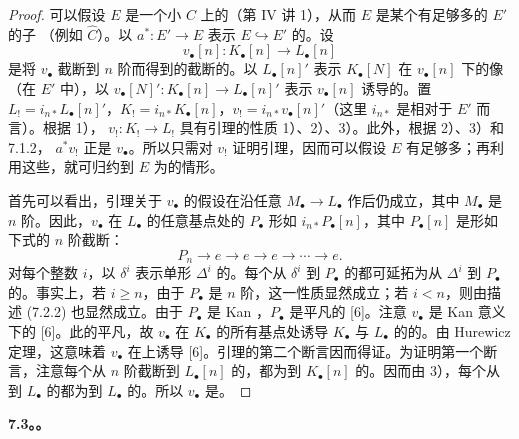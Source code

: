 \begin{proof}
可以假设 $E$ 是一个小 $C$ 上的（第 IV 讲 1），从而 $E$ 是某个有足够多的 $E'$ 的子
（例如 $\widehat C$）。以 $a^*:E'\to E$ 表示 $E\hookrightarrow E'$ 的。设
\[v_\bullet[n]:K_\bullet[n]\longrightarrow L_\bullet[n]\]
是将 $v_\bullet$ 截断到 $n$ 阶而得到的截断的。以 $L_\bullet[n]'$ 表示 $K_\bullet[N]$ 在 $v_\bullet[n]$ 下的像（在 $E'$ 中），以 $v_\bullet[N]':K_\bullet[n]\to L_\bullet[n]'$ 表示 $v_\bullet[n]$ 诱导的。置 $L_!=i_{n*}L_\bullet[n]'$，$K_!=i_{n*}K_\bullet[n]$，$v_!=i_{n*}v_\bullet[n]'$（这里 $i_{n*}$ 是相对于 $E'$ 而言）。根据 1）， $v_!:K_!\to L_!$ 具有引理的性质 1）、2）、3）。此外，根据 2）、3）和 7.1.2， $a^*v_!$ 正是 $v_\bullet$。所以只需对 $v_!$ 证明引理，因而可以假设 $E$ 有足够多；再利用这些，就可归约到 $E$ 为的情形。

首先可以看出，引理关于 $v_\bullet$ 的假设在沿任意 $M_\bullet\to L_\bullet$ 作后仍成立，其中 $M_\bullet$ 是 $n$ 阶。因此，$v_\bullet$ 在 $L_\bullet$ 的任意基点处的 $P_\bullet$ 形如 $i_{n*}P_\bullet[n]$，其中 $P_\bullet[n]$ 是形如下式的 $n$ 阶截断：
\begin{equation}P_n\longrightarrow e\longrightarrow e\longrightarrow e\longrightarrow\cdots\longrightarrow e.\tag{7.2.2}\end{equation}
对每个整数 $i$，以 $\delta^i$ 表示单形 $\Delta^i$ 的。每个从 $\delta^i$ 到 $P_\bullet$ 的都可延拓为从 $\Delta^i$ 到 $P_\bullet$ 的。事实上，若 $i\geq n$，由于 $P_\bullet$ 是 $n$ 阶，这一性质显然成立；若 $i<n$，则由描述 (7.2.2) 也显然成立。由于 $P_\bullet$ 是 Kan ，$P_\bullet$ 是平凡的 [6]。注意 $v_\bullet$ 是 Kan 意义下的 [6]。此的平凡，故 $v_\bullet$ 在 $K_\bullet$ 的所有基点处诱导 $K_\bullet$ 与 $L_\bullet$ 的的。由 Hurewicz 定理，这意味着 $v_\bullet$ 在上诱导 [6]。引理的第二个断言因而得证。为证明第一个断言，注意每个从 $n$ 阶截断到 $L_\bullet[n]$ 的，都为到 $K_\bullet[n]$ 的。因而由 3），每个从到 $L_\bullet$ 的都为到 $L_\bullet$ 的。所以 $v_\bullet$ 是。
\end{proof}
\textbf{7.3。。}


